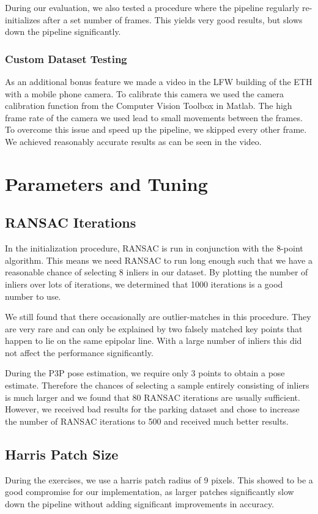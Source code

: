 \documentclass[11pt]{article}
\begin{document}
During our evaluation, we also tested a procedure where the pipeline regularly re-initializes after a set number of frames. This yields very good results, but slows down the pipeline significantly.

\subsubsection{Custom Dataset Testing}
As an additional bonus feature we made a video in the LFW building of the ETH with a mobile phone camera. To calibrate this camera we used the camera calibration function from the Computer Vision Toolbox in Matlab. The high frame rate of the camera we used lead to small movements between the frames. To overcome this issue and speed up the pipeline, we skipped every other frame. We achieved reasonably accurate results as can be seen in the video.

\section{Parameters and Tuning}
\subsection{RANSAC Iterations}
In the initialization procedure, RANSAC is run in conjunction with the 8-point algorithm. This means we need RANSAC to run long enough such that we have a reasonable chance of selecting 8 inliers in our dataset. By plotting the number of inliers over lots of iterations, we determined that 1000 iterations is a good number to use.

We still found that there occasionally are outlier-matches in this procedure. They are very rare and can only be explained by two falsely matched key points that happen to lie on the same epipolar line. With a large number of inliers this did not affect the performance significantly.

During the P3P pose estimation, we require only 3 points to obtain a pose estimate. Therefore the chances of selecting a sample entirely consisting of inliers is much larger and we found that 80 RANSAC iterations are usually sufficient. However, we received bad results for the parking dataset and chose to increase the number of RANSAC iterations to 500 and received much better results.

\subsection{Harris Patch Size}
During the exercises, we use a harris patch radius of 9 pixels. This showed to be a good compromise for our implementation, as larger patches significantly slow down the pipeline without adding significant improvements in accuracy.
\end{document}
